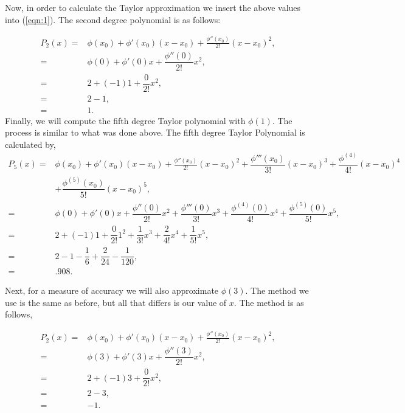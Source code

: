\documentclass[12pt, letterpaper]{article}  %
\begin{document}
Now, in order to calculate the Taylor approximation we insert the above values into (\ref{eqn:1}). 
The second degree polynomial is as follows:

\begin{align*}
  P_2(x) =& \phi(x_0) + \phi'(x_0)(x-x_0) + \frac{\phi''(x_0)}{2!}(x-x_0)^2,\\
  =& \phi(0) + \phi'(0)x + \dfrac{\phi''(0)}{2!}x^2, \\
  =& 2 + (-1)1 + \dfrac{0}{2!}x^2, \\
  =& 2 - 1, \\
  =& 1.
\end{align*}
\newpage
Finally, we will compute the fifth degree Taylor polynomial with $\phi(1)$. The process is similar to what was done above.
The fifth degree Taylor Polynomial is calculated by,
\begin{align*}
  P_5(x) =& \phi(x_0) + \phi'(x_0)(x-x_0) + \frac{\phi''(x_0)}{2!}(x-x_0)^2 
  + \dfrac{\phi'''(x_0)}{3!}(x-x_0)^3 + \dfrac{\phi^{(4)}}{4!}(x-x_0)^4 \\
          &+ \dfrac{\phi^{(5)}(x_0)}{5!}(x-x_0)^5, \\
  =& \phi(0) + \phi'(0)x + \dfrac{\phi''(0)}{2!}x^2 + \dfrac{\phi'''(0)}{3!}x^3 
  + \dfrac{\phi^{(4)}(0)}{4!}x^4 + \dfrac{\phi^{(5)}(0)}{5!}x^5, \\
  =& 2 + (-1)1 + \dfrac{0}{2!}1^2 + \dfrac{1}{3!}x^3 + \dfrac{2}{4!}x^4 + \dfrac{1}{5!}x^5, \\
  =& 2 - 1 - \dfrac{1}{6} + \dfrac{2}{24} - \dfrac{1}{120}, \\
  =& .908.
\end{align*}


Next, for a measure of accuracy we will also approximate $\phi(3)$.  The method we use is the same as before, but 
all that differs is our value of $x$.  The method is as follows,

\begin{align*}
  P_2(x) =& \phi(x_0) + \phi'(x_0)(x-x_0) + \frac{\phi''(x_0)}{2!}(x-x_0)^2,\\
  =& \phi(3) + \phi'(3)x + \dfrac{\phi''(3)}{2!}x^2, \\
  =& 2 + (-1)3 + \dfrac{0}{2!}x^2, \\
  =& 2 - 3, \\
  =& -1.
\end{align*}
\end{document}
